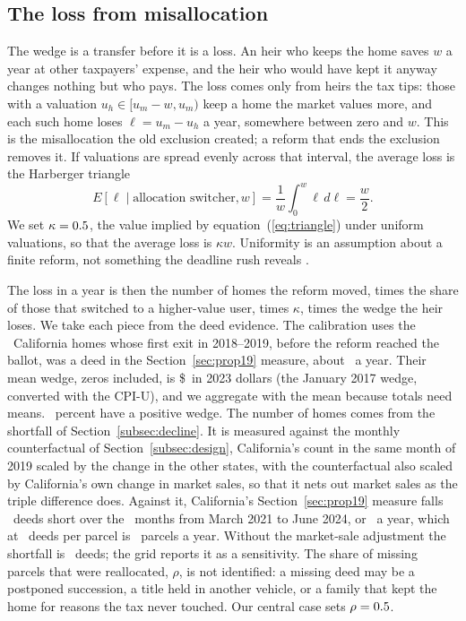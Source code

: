 \subsection{The loss from misallocation}\label{subsec:loss}

The wedge is a transfer before it is a loss. An heir who keeps the home saves $w$ a year at other taxpayers' expense, and the heir who would have kept it anyway changes nothing but who pays. The loss comes only from heirs the tax tips: those with a valuation $u_h\in[u_m-w,u_m)$ keep a home the market values more, and each such home loses $\ell=u_m-u_h$ a year, somewhere between zero and $w$. This is the misallocation the old exclusion created; a reform that ends the exclusion removes it. If valuations are spread evenly across that interval, the average loss is the Harberger triangle
\begin{equation}
 E[\ell\mid\text{allocation switcher},w]
   =\frac{1}{w}\int_0^w \ell\,d\ell=\frac{w}{2}.
 \label{eq:triangle}
\end{equation}
We set $\kappa=0.5$, the value implied by equation~(\ref{eq:triangle}) under uniform valuations, so that the average loss is $\kappa w$. Uniformity is an assumption about a finite reform, not something the deadline rush reveals \citep{chetty2009sufficient}.

The loss in a year is then the number of homes the reform moved, times the share of those that switched to a higher-value user, times $\kappa$, times the wedge the heir loses. We take each piece from the deed evidence. The calibration uses the \WViParcels\ California homes whose first exit in 2018--2019, before the reform reached the ballot, was a deed in the Section~\ref{sec:prop19} measure, about \WViParcelsPerYear\ a year. Their mean wedge, zeros included, is \$\WViWedgeMean\ in 2023 dollars (the January 2017 wedge, converted with the CPI-U), and we aggregate with the mean because totals need means. \WViSharePositive\ percent have a positive wedge. The number of homes comes from the shortfall of Section~\ref{subsec:decline}. It is measured against the monthly counterfactual of Section~\ref{subsec:design}, California's count in the same month of 2019 scaled by the change in the other states, with the counterfactual also scaled by California's own change in market sales, so that it nets out market sales as the triple difference does. Against it, California's Section~\ref{sec:prop19} measure falls \WViShortfallDeeds\ deeds short over the \WViHoleMonths\ months from March 2021 to June 2024, or \WViShortfallDeedsYear\ a year, which at \WViDeedsPerParcel\ deeds per parcel is \WViShortfallParcelsYear\ parcels a year. Without the market-sale adjustment the shortfall is \WViShortfallDeedsCF\ deeds; the grid reports it as a sensitivity. The share of missing parcels that were reallocated, $\rho$, is not identified: a missing deed may be a postponed succession, a title held in another vehicle, or a family that kept the home for reasons the tax never touched. Our central case sets $\rho=0.5$.

